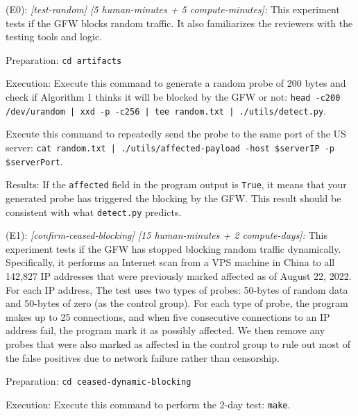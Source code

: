 \begin{compactdesc}
    \item[(E0):] \textit{[test-random] [5 human-minutes + 5 compute-minutes]:
    } This experiment tests if the GFW blocks random traffic.
    It also familiarizes the reviewers with the testing tools and logic.
    \begin{asparadesc}
        \item[Preparation:] \texttt{cd artifacts}
        \item[Execution:]  
        Execute this command to generate a random probe of 200 bytes and
        check if Algorithm 1 thinks it will be blocked by the GFW or not:
        \texttt{head -c200 /dev/urandom | xxd -p -c256 | tee random.txt | ./utils/detect.py}.
        
        Execute this command to repeatedly send the probe to the same port of the US server:
        \texttt{cat random.txt | ./utils/affected-payload -host \$serverIP -p \$serverPort}.

        \item[Results:] 
        If the \texttt{affected} field in the program output is \texttt{True},
        it means that your generated probe has triggered the blocking by the GFW. 
        This result should be consistent with what \texttt{detect.py} predicts.
    \end{asparadesc}

    \item[(E1):] \textit{[confirm-ceased-blocking] [15 human-minutes + 2 compute-days]:
    } This experiment tests if the GFW has stopped blocking random traffic dynamically.
    Specifically, it performs an Internet scan from a VPS machine in China 
    to all 142,827 IP addresses that were previously marked affected as of August 22, 2022.
    For each IP address, 
    The test uses two types of probes: 
    50-bytes of random data and 50-bytes of zero (as the control group). 
    For each type of probe, the program makes up to 25 connections, 
    and when five consecutive connections to an IP address fail, the program mark it as possibly affected. 
    We then remove any probes that were also marked as affected in the control group to rule out 
    most of the false positives due to network failure rather than censorship.
    \begin{asparadesc}
        \item[Preparation:] \texttt{cd ceased-dynamic-blocking}
        \item[Execution:]
        Execute this command to perform the 2-day test: 
        \texttt{make}. 


\end{asparadesc}
\end{compactdesc}
